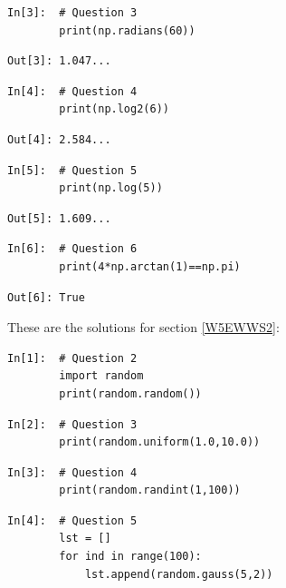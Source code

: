 \begin{lstlisting}[style=PY]
In[3]:  # Question 3
        print(np.radians(60))
\end{lstlisting}
\begin{lstlisting}[style=PY_out]
Out[3]: 1.047... 
\end{lstlisting}

\begin{lstlisting}[style=PY]
In[4]:  # Question 4
        print(np.log2(6))
\end{lstlisting}
\begin{lstlisting}[style=PY_out]
Out[4]: 2.584...
\end{lstlisting}

\newpage
\begin{lstlisting}[style=PY]
In[5]:  # Question 5
        print(np.log(5))
\end{lstlisting}
\begin{lstlisting}[style=PY_out]
Out[5]: 1.609... 
\end{lstlisting}

\begin{lstlisting}[style=PY]
In[6]:  # Question 6
        print(4*np.arctan(1)==np.pi)
\end{lstlisting}
\begin{lstlisting}[style=PY_out]
Out[6]: True
\end{lstlisting}

\noindent These are the solutions for section \ref{W5EWWS2}:
\begin{lstlisting}[style=PY]
In[1]:  # Question 2
        import random
        print(random.random())
\end{lstlisting}

\begin{lstlisting}[style=PY]
In[2]:  # Question 3
        print(random.uniform(1.0,10.0))
\end{lstlisting}

\begin{lstlisting}[style=PY]
In[3]:  # Question 4
        print(random.randint(1,100))
\end{lstlisting}

\begin{lstlisting}[style=PY]
In[4]:  # Question 5
        lst = []
        for ind in range(100):
            lst.append(random.gauss(5,2))
\end{lstlisting}

